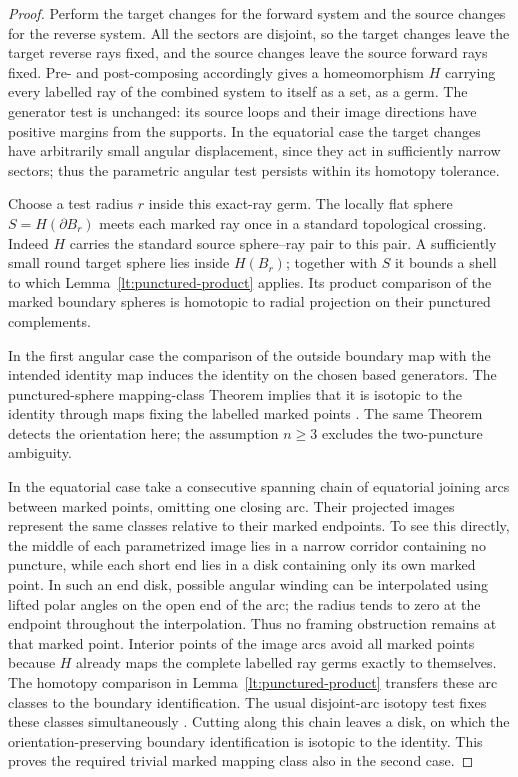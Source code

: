 \begin{proof}
Perform the target changes for the forward system and the source
changes for the reverse system.  All the sectors are disjoint, so
the target changes leave the target reverse rays fixed, and the
source changes leave the source forward rays fixed.  Pre- and
post-composing accordingly gives a homeomorphism $H$ carrying every
labelled ray of the combined system to itself as a set, as a germ.
The generator test is unchanged: its source loops and their image
directions have positive margins from the supports.  In the
equatorial case the target changes have arbitrarily small angular
displacement, since they act in sufficiently narrow sectors; thus
the parametric angular test persists within its homotopy tolerance.

Choose a test radius $r$ inside this exact-ray germ.  The locally flat
sphere $S=H(\partial B_r)$ meets each marked ray once in a standard
topological crossing.  Indeed $H$ carries the standard source
sphere--ray pair to this pair.  A sufficiently small round target
sphere lies inside $H(B_r)$; together with $S$ it bounds a shell to
which Lemma~\ref{lt:punctured-product} applies.  Its product comparison
of the marked boundary spheres is homotopic to radial projection on
their punctured complements.

In the first angular case the comparison of the outside boundary map
with the intended identity map induces the identity on the chosen
based generators.  The punctured-sphere mapping-class Theorem implies
that it is isotopic to the identity through maps fixing the labelled
marked points \cite[Theorem~8.8]{FarbMargalit2012}.
The same Theorem detects the orientation here; the
assumption $n\geq3$ excludes the two-puncture ambiguity.

In the equatorial case take a consecutive spanning chain of equatorial
joining arcs between marked points, omitting one closing arc. Their
projected images represent the same
classes relative to their marked endpoints.  To see this directly,
the middle of each parametrized image lies in a narrow corridor
containing no puncture, while each short end lies in a disk containing
only its own marked point.  In such an end disk, possible angular
winding can be interpolated using lifted polar angles on the open
end of the arc; the radius tends to zero at the endpoint throughout
the interpolation.  Thus no framing obstruction remains at that
marked point.  Interior points of the image arcs avoid all marked
points because $H$ already maps the complete labelled ray germs
exactly to themselves.  The homotopy comparison in
Lemma~\ref{lt:punctured-product} transfers these arc classes to the
boundary identification.  The usual disjoint-arc isotopy test fixes
these classes simultaneously
\cite[Section~1.2.7, Proposition~2.8, and Lemma~2.9]{FarbMargalit2012}.
Cutting along this chain leaves a disk,
on which the orientation-preserving boundary identification is
isotopic to the identity.  This proves the required trivial marked
mapping class also in the second case.


\end{proof}
